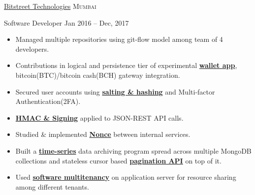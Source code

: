 \documentclass[11pt,a4paper]{article}
\begin{document}



\headedsection
  {\href{http://bitstreet.in/}{Bitstreet Technologies}}
  {\textsc{Mumbai}}
  {%
    \headedsubsection
    {Software Developer}
    {Jan 2016 -- Dec, 2017}
    {
      \begin{itemize}
        \item Managed multiple repositories using git-flow model among team of 4 developers.
        \item Contributions in logical and persistence tier of experimental \href{https://rihbyne.github.io/diy/digital-wallet/}{\textbf{wallet app}}, bitcoin(BTC)/bitcoin cash(BCH) gateway integration.
        \item Secured user accounts using \href{https://rihbyne.github.io/blog/user-auth/}{\textbf{salting \& hashing}} and Multi-factor Authentication(2FA).
        \item \href{https://rihbyne.github.io/blog/hmac-authentication/}{\textbf{HMAC \& Signing}} applied to JSON-REST API calls.
        \item Studied \& implemented \href{https://rihbyne.github.io/diy/nonce-auth-systems/}{\textbf{Nonce}} between internal services.
        \item Built a \href{https://rihbyne.github.io/diy/notification-core/}{\textbf{time-series}} data archiving program spread across multiple MongoDB collections and stateless cursor based \href{https://rihbyne.github.io/diy/stateless-pagination/}{\textbf{pagination API}} on top of it.
        \item Used \href{https://rihbyne.github.io/diy/multi-tenancy/}{\textbf{software multitenancy}} on application server for resource sharing among different tenants.
      \end{itemize}
    }
  }
\end{document}

